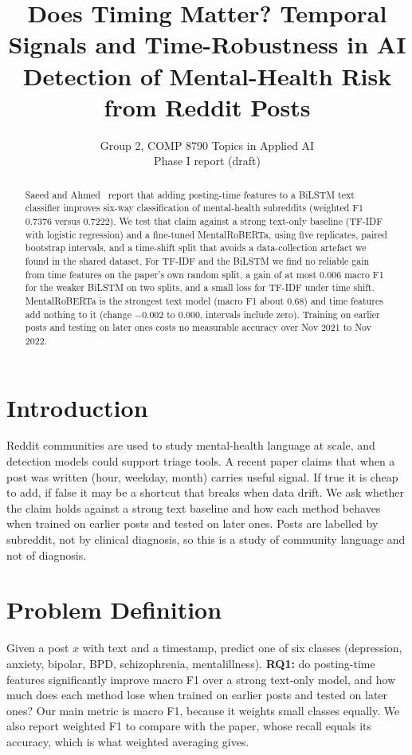 \documentclass[10pt,twocolumn]{article}
\title{Does Timing Matter? Temporal Signals and Time-Robustness in AI Detection of Mental-Health Risk from Reddit Posts}
\author{Group 2, COMP 8790 Topics in Applied AI \\ \small Phase I report (draft)}
\date{}
\begin{document}
\maketitle
\begin{abstract}
Saeed and Ahmed~\cite{saeed} report that adding posting-time features to a BiLSTM text classifier improves six-way classification of mental-health subreddits (weighted F1 0.7376 versus 0.7222). We test that claim against a strong text-only baseline (TF-IDF with logistic regression) and a fine-tuned MentalRoBERTa, using five replicates, paired bootstrap intervals, and a time-shift split that avoids a data-collection artefact we found in the shared dataset. For TF-IDF and the BiLSTM we find no reliable gain from time features on the paper's own random split, a gain of at most 0.006 macro F1 for the weaker BiLSTM on two splits, and a small loss for TF-IDF under time shift. MentalRoBERTa is the strongest text model (macro F1 about 0.68) and time features add nothing to it (change $-0.002$ to $0.000$, intervals include zero). Training on earlier posts and testing on later ones costs no measurable accuracy over Nov 2021 to Nov 2022.
\end{abstract}

\section{Introduction}
Reddit communities are used to study mental-health language at scale, and detection models could support triage tools. A recent paper claims that when a post was written (hour, weekday, month) carries useful signal. If true it is cheap to add, if false it may be a shortcut that breaks when data drift. We ask whether the claim holds against a strong text baseline and how each method behaves when trained on earlier posts and tested on later ones. Posts are labelled by subreddit, not by clinical diagnosis, so this is a study of community language and not of diagnosis.

\section{Problem Definition}
Given a post $x$ with text and a timestamp, predict one of six classes (depression, anxiety, bipolar, BPD, schizophrenia, mentalillness). \textbf{RQ1:} do posting-time features significantly improve macro F1 over a strong text-only model, and how much does each method lose when trained on earlier posts and tested on later ones? Our main metric is macro F1, because it weights small classes equally. We also report weighted F1 to compare with the paper, whose recall equals its accuracy, which is what weighted averaging gives.
\end{document}

